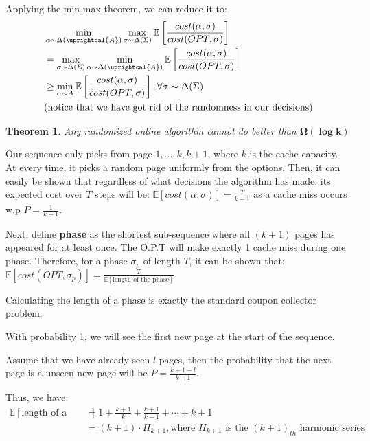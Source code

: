 \documentclass[11pt]{article}
\newtheorem{theorem}[fact]{Theorem}
\begin{document}
Applying the min-max theorem, we can reduce it to:
\begin{align*}
&\min_{\alpha \sim \Delta(\uprightcal{A})}\max_{\sigma \sim \Delta(\Sigma)}\mathbb{E}\left[\frac{cost(\alpha, \sigma)}{cost(OPT, \sigma)}\right] \\
&=\max_{\sigma \sim \Delta(\Sigma)}\min_{\alpha \sim \Delta(\uprightcal{A})}\mathbb{E}\left[\frac{cost(\alpha, \sigma)}{cost(OPT, \sigma)}\right] \\
&\geq \min_{\alpha \sim A} \mathbb{E}\left[\frac{cost(\alpha, \sigma)}{cost(OPT, \sigma)}\right], \forall \sigma \sim \Delta(\Sigma) \\
&\text{(notice that we have got rid of the randomness in our decisions)}
\end{align*}
\newpage
\begin{theorem}
    Any randomized online algorithm cannot do better than $\boldsymbol{\Omega(\log k)}$
\end{theorem}
Our sequence only picks from page $1, \dots, k, k+1$, where $k$ is the cache capacity. At every time, it picks a random page uniformly from the options. Then, it can easily be shown that regardless of what decisions the algorithm has made, its expected cost over $T$ steps will be: $\mathbb{E}\left[cost(\alpha, \sigma)\right] = \frac{T}{k+1}$ as a cache miss occurs w.p $P = \frac{1}{k+1}$. \newline 

Next, define \textbf{phase} as the shortest sub-sequence where all $(k+1)$ pages has appeared for at least once. The O.P.T will make exactly 1 cache miss during one phase. Therefore, for a phase $\sigma_p$ of length $T$, it can be shown that:
$\mathbb{E}\left[cost(OPT, \sigma_p)\right] = \frac{T}{\mathbb{E}\left[\text{length of the phase}\right]}$

Calculating the length of a phase is exactly the standard coupon collector problem. \newline

With probability 1, we will see the first new page at the start of the sequence.\newline

Assume that we have already seen $l$ pages, then the probability that the next page is a unseen new page will be $P = \frac{k+1-l}{k+1}$. \newline

Thus, we have:
\begin{align*}
\mathbb{E}\left[\text{length of a phase}\right] &= 1 + \frac{k+1}{k} + \frac{k+1}{k-1} + \cdots  + k+1\\
&= (k+1) \cdot H_{k+1}, \text{where $H_{k+1}$ is the $(k+1)_{th}$ harmonic series}    
\end{align*}
\end{document}

